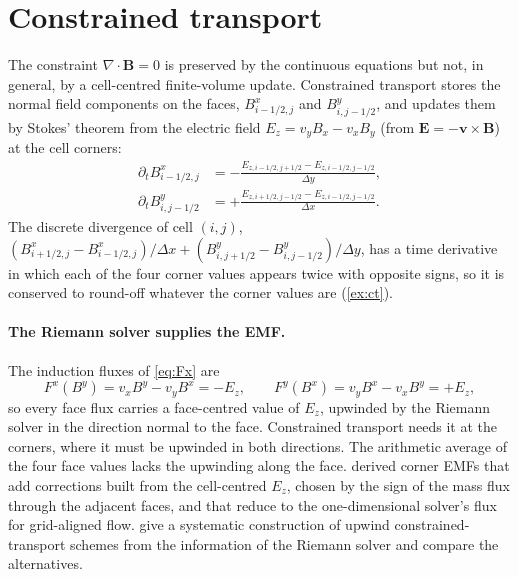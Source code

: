 \documentclass[11pt,a4paper,oneside,openany]{book}
\newcommand{\textcite}{\citet}
\newcommand{\parencite}{\citep}
\theoremstyle{definition}
\theoremstyle{plain}
\theoremstyle{remark}
\newcommand{\vv}{\bm{v}}
\newcommand{\BB}{\bm{B}}
\newcommand{\EE}{\bm{E}}
\begin{document}
\section{Constrained transport}\label{sec:ct}

The constraint $\nabla\cdot\BB=0$ is preserved by the continuous equations but not, in
general, by a cell-centred finite-volume update. Constrained transport
\parencite{EvansHawley1988} stores the normal field components on the faces,
$B^x_{i-1/2,j}$ and $B^y_{i,j-1/2}$, and updates them by Stokes' theorem from the electric
field $E_z=v_yB_x-v_xB_y$ (from $\EE=-\vv\times\BB$) at the cell corners:
\begin{align}
\partial_tB^x_{i-1/2,j}&=-\frac{E_{z,i-1/2,j+1/2}-E_{z,i-1/2,j-1/2}}{\Delta y},\\
\partial_tB^y_{i,j-1/2}&=+\frac{E_{z,i+1/2,j-1/2}-E_{z,i-1/2,j-1/2}}{\Delta x}.
\end{align}
The discrete divergence of cell $(i,j)$,
$(B^x_{i+1/2,j}-B^x_{i-1/2,j})/\Delta x+(B^y_{i,j+1/2}-B^y_{i,j-1/2})/\Delta y$, has a time
derivative in which each of the four corner values appears twice with opposite signs, so it
is conserved to round-off whatever the corner values are (\cref{ex:ct}).

\paragraph{The Riemann solver supplies the EMF.} The induction fluxes of \eqref{eq:Fx} are
\begin{equation}
F^x(B^y)=v_xB^y-v_yB^x=-E_z,\qquad F^y(B^x)=v_yB^x-v_xB^y=+E_z ,
\end{equation}
so every face flux carries a face-centred value of $E_z$, upwinded by the Riemann solver in
the direction normal to the face. Constrained transport needs it at the corners, where it
must be upwinded in both directions. The arithmetic average of the four face values
\parencite{BalsaraSpicer1999} lacks the upwinding along the face.
\textcite{GardinerStone2005} derived corner EMFs that add corrections built from the
cell-centred $E_z$, chosen by the sign of the mass flux through the adjacent faces, and that
reduce to the one-dimensional solver's flux for grid-aligned flow.
\textcite{MignoneDelZanna2021} give a systematic construction of upwind constrained-transport
schemes from the information of the Riemann solver and compare the alternatives.
\end{document}
